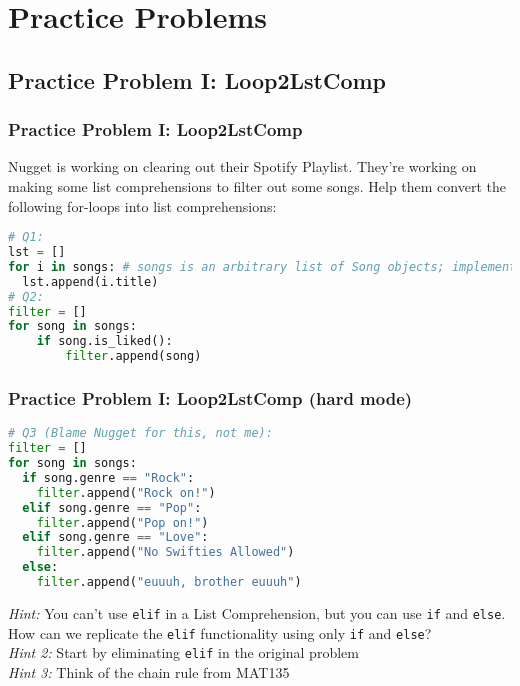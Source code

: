 \documentclass[hyperref={colorlinks,citecolor=blue,linkcolor=blue,urlcolor=blue}]{beamer}
\begin{document}
\section{Practice Problems}
\subsection{Practice Problem I: Loop2LstComp}
\begin{frame}[fragile]
  
  \frametitle{Practice Problem I: Loop2LstComp}

  Nugget is working on clearing out their Spotify Playlist. They're working on making some list comprehensions to filter out some songs. Help them convert the following for-loops into list comprehensions:
  \begin{lstlisting}[language=Python, style=mystyle]
# Q1: 
lst = []
for i in songs: # songs is an arbitrary list of Song objects; implementation is irrelevant for this question 
  lst.append(i.title)
# Q2:
filter = []
for song in songs:
    if song.is_liked():
        filter.append(song)
\end{lstlisting}

\end{frame}

\begin{frame}[fragile]
  \frametitle{Practice Problem I: Loop2LstComp (hard mode)}
  \begin{lstlisting}[language=Python, style=mystyle]
# Q3 (Blame Nugget for this, not me):
filter = []
for song in songs:
  if song.genre == "Rock":
    filter.append("Rock on!")
  elif song.genre == "Pop":
    filter.append("Pop on!")
  elif song.genre == "Love":
    filter.append("No Swifties Allowed")
  else:
    filter.append("euuuh, brother euuuh")
    \end{lstlisting}
\textit{Hint:} You can't use \texttt{elif} in a List Comprehension, but you can use \texttt{if} and \texttt{else}. How can we replicate the \texttt{elif} functionality using only \texttt{if} and \texttt{else}?\\
\textit{Hint 2:} Start by eliminating \texttt{elif} in the original problem\\
\textit{Hint 3:} Think of the chain rule from MAT135
\end{frame}
\end{document}
